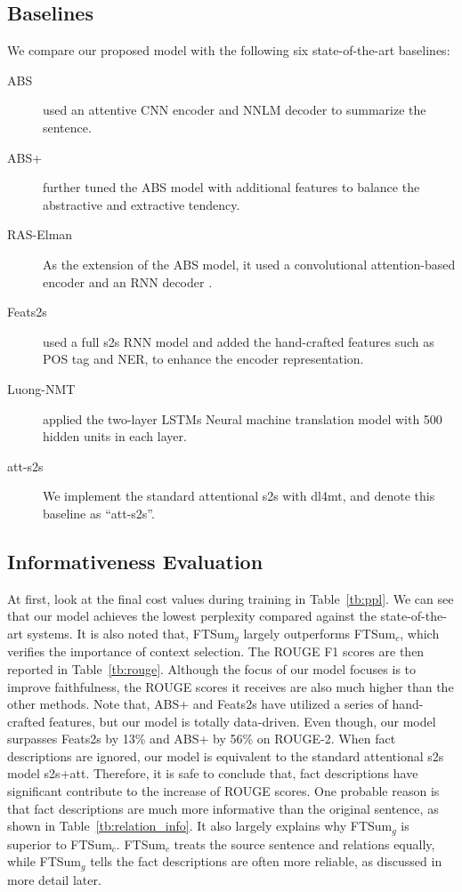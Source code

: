 \documentclass[letterpaper]{article} \usepackage{aaai18}  \usepackage{times}  \usepackage{helvet}  \usepackage{courier}  \usepackage{url}  \usepackage{graphicx}  \usepackage{amsfonts}
\begin{document}
	
	\subsection{Baselines}
	We compare our proposed model with the following six state-of-the-art baselines:
	\begin{description}
		\item[ABS] \cite{rush2015neural} used an attentive CNN encoder and NNLM decoder to summarize the sentence.
		\item[ABS+] \cite{rush2015neural}
		further tuned the ABS model with additional features to balance
		the abstractive and extractive tendency.
		\item[RAS-Elman] As the extension of the ABS model, it used a convolutional attention-based encoder and an RNN decoder \cite{chopra2016abstractive}.
		\item[Feats2s]  \cite{nallapati2016abstractive} used a full
		s2s RNN model and added the hand-crafted features such as POS tag and NER, to enhance the encoder representation.
		\item[Luong-NMT] \cite{luong2015effective} applied the two-layer LSTMs Neural machine translation model with 500 hidden
		units in each layer.
		\item[att-s2s] We implement the standard attentional s2s with dl4mt, and denote this baseline as ``att-s2s''.
	\end{description}
	
	\subsection{Informativeness Evaluation}
	At first, look at the final cost values during training in Table~\ref{tb:ppl}.
	We can see that our model achieves the lowest perplexity compared against the state-of-the-art systems.
	It is also noted that, FTSum$_g$ largely outperforms FTSum$_c$, which verifies the importance of context selection.
	The ROUGE F1 scores are then reported in Table~\ref{tb:rouge}.
	Although the focus of our model focuses is to improve faithfulness, the ROUGE scores it receives are also much higher than the other methods.
	Note that, ABS+ and Feats2s have utilized a series of hand-crafted features, but our model is totally data-driven.
	Even though, our model surpasses Feats2s by 13\% and ABS+ by 56\% on ROUGE-2.
	When fact descriptions are ignored, our model is equivalent to the standard attentional s2s model s2s+att.
	Therefore, it is safe to conclude that, fact descriptions have significant contribute to the increase of ROUGE scores.
One probable reason is that fact descriptions are much more informative than the original sentence, as shown in Table~\ref{tb:relation_info}.
	It also largely explains why FTSum$_g$ is superior to FTSum$_c$.
	FTSum$_c$ treats the source sentence and relations equally, while FTSum$_g$ tells the fact descriptions are often more reliable, as discussed in more detail later.
	
\end{document}

